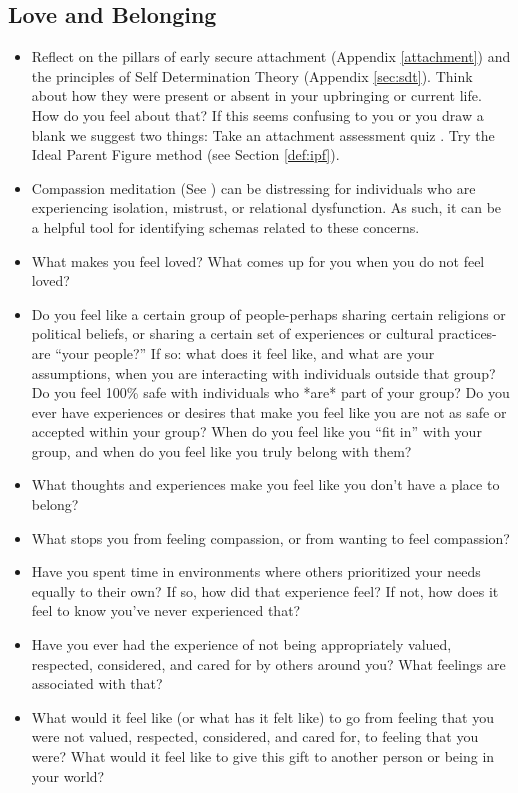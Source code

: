 \documentclass[12pt,letterpaper]{book}
\begin{document}
\subsection*{Love and Belonging}
\begin{itemize}
    \item Reflect on the pillars of early secure attachment (Appendix \ref{attachment}) and the principles of Self Determination Theory (Appendix \ref{sec:sdt}). Think about how they were present or absent in your upbringing or current life. How do you feel about that? If this seems confusing to you or you draw a blank we suggest two things: Take an attachment assessment quiz \cite{attachmentProject}. Try the Ideal Parent Figure method (see Section \ref{def:ipf}).
    \item Compassion meditation (See \textcite{lkMeditation}) can be distressing for individuals who are experiencing isolation, mistrust, or relational dysfunction. As such, it can be a helpful tool for identifying schemas related to these concerns.
    \item What makes you feel loved? What comes up for you when you do not feel loved?
    \item Do you feel like a certain group of people-perhaps sharing certain religions or political beliefs, or sharing a certain set of experiences or cultural practices-are “your people?” If so: what does it feel like, and what are your assumptions, when you are interacting with individuals outside that group? Do you feel 100\% safe with individuals who *are* part of your group? Do you ever have experiences or desires that make you feel like you are not as safe or accepted within your group? When do you feel like you “fit in” with your group, and when do you feel like you truly belong with them?
    \item What thoughts and experiences make you feel like you don't have a place to belong?
    \item What stops you from feeling compassion, or from wanting to feel compassion?
    \item Have you spent time in environments where others prioritized your needs equally to their own? If so, how did that experience feel? If not, how does it feel to know you've never experienced that?
    \item Have you ever had the experience of not being appropriately valued, respected, considered, and cared for by others around you? What feelings are associated with that?
    \item What would it feel like (or what has it felt like) to go from feeling that you were not valued, respected, considered, and cared for, to feeling that you were? What would it feel like to give this gift to another person or being in your world?

\end{itemize}
\end{document}
